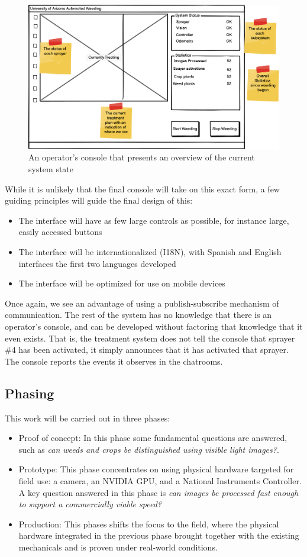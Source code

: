 \documentclass[letterpaper]{article}
\begin{document}
{{\begin{figure}[H]
	\centering
	\includegraphics[width=0.75\linewidth]{./figures/console-operator.png}
	\caption[An operator's console]{An operator's console that presents an overview of the current system state}
	\label{fig:console-operator}
\end{figure}

While it is unlikely that the final console will take on this exact form, a few guiding principles will guide the final design of this:
\begin{itemize}
	\item{The interface will have as few large controls as possible, for instance large, easily accessed buttons}
	\item{The interface will be internationalized (I18N), with Spanish and English interfaces the first two languages developed}
	\item{The interface will be optimized for use on mobile devices}
\end{itemize}

Once again, we see an advantage of using a publish-subscribe mechanism of communication. The rest of the system has no knowledge that there is an operator's console, and can be developed without factoring that knowledge that it even exists. That is, the treatment system does not tell the console that sprayer \#4 has been activated, it simply announces that it has activated that sprayer.  The console reports the events it observes in the chatrooms.

\subsection{Phasing}
This work will be carried out in three phases:
\begin{itemize}
\item{Proof of concept: In this phase some fundamental questions are answered, such as \textit{can weeds and crops be distinguished using visible light images?}}.
\item{Prototype: This phase concentrates on using physical hardware targeted for field use: a camera, an NVIDIA GPU, and a National Instruments Controller. A key question answered in this phase is \textit{can images be processed fast enough to support a commercially viable speed?}}
\item{Production: This phases shifts the focus to the field, where the physical hardware integrated in the previous phase brought together with the existing mechanicals and is proven under real-world conditions.} 
\end{itemize}

}}
\end{document}
